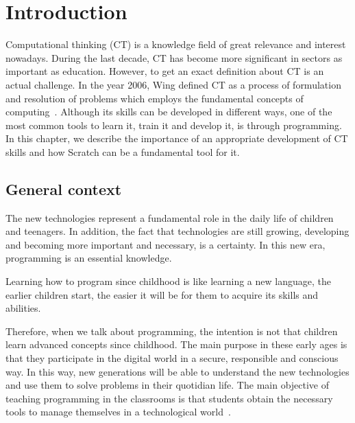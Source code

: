 

\cleardoublepage
\chapter{Introduction}
\label{sec:intro}

Computational thinking (CT) is a knowledge field of great relevance and interest nowadays. During the last decade, CT has become more significant in sectors as important as education. However, to get an exact definition about CT is an actual challenge. In the year 2006, Wing defined CT as a process of formulation and resolution of problems which employs the fundamental concepts of computing~\cite{wing:_ct}. Although its skills can be developed in different ways, one of the most common tools to learn it, train it and develop it, is through programming. In this chapter, we describe the importance of an appropriate development of CT skills and how Scratch can be a fundamental tool for it. 


\section{General context}
\label{sec:context}

The new technologies represent a fundamental role in the daily life of children and teenagers. In addition, the fact that technologies are still growing, developing and becoming more important and necessary, is a certainty. In this new era, programming is an essential knowledge. 

Learning how to program since childhood is like learning a new language, the earlier children start, the easier it will be for them to acquire its skills and abilities.

Therefore, when we talk about programming, the intention is not that children learn advanced concepts since childhood. The main purpose in these early ages is that they participate in the digital world in a secure, responsible and conscious way. In this way, new generations will be able to understand the new technologies and use them to solve problems in their quotidian life. The main objective of teaching programming in the classrooms is that students obtain the necessary tools to manage themselves in a technological world~\cite{mangifesta:_importancia}. 

